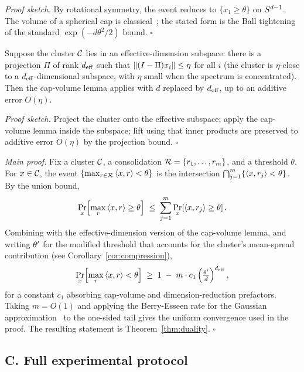 \noindent\emph{Proof sketch.} By rotational symmetry, the event
reduces to $\{x_1 \geq \theta\}$ on $S^{d-1}$. The volume of a
spherical cap is classical~\cite{ball1997elementary,
milman1986asymptotic}; the stated form is the Ball tightening of the
standard $\exp(-d\theta^2/2)$ bound. $\square$

\begin{lemma}
Suppose the cluster $\mathcal{C}$ lies in an effective-dimension
subspace: there is a projection $\Pi$ of rank ${d_{\mathrm{eff}}}$ such that
$\left\lVert(I - \Pi) x_i\right\rVert \leq \eta$ for all $i$ (the cluster is
$\eta$-close to a ${d_{\mathrm{eff}}}$-dimensional subspace, with $\eta$ small
when the spectrum is concentrated). Then the cap-volume lemma
applies with $d$ replaced by ${d_{\mathrm{eff}}}$, up to an additive error
$O(\eta)$.
\end{lemma}

\noindent\emph{Proof sketch.} Project the cluster onto the effective
subspace; apply the cap-volume lemma inside the subspace; lift
using that inner products are preserved to additive error $O(\eta)$
by the projection bound. $\square$

\noindent\emph{Main proof.} Fix a cluster $\mathcal{C}$, a
consolidation $\mathcal{R} = \{r_1, \ldots, r_m\}$, and a threshold
$\theta$. For $x \in \mathcal{C}$, the event
$\{\max_{r \in \mathcal{R}} \left\langle x,r\right\rangle < \theta\}$ is the intersection
$\bigcap_{j=1}^{m} \{\left\langle x,r_j\right\rangle < \theta\}$. By the union bound,
\[
\Pr_{x}\!\left[\max_{r} \left\langle x,r\right\rangle \geq \theta \right] \;\leq\;
\sum_{j=1}^{m} \Pr_{x}\!\left[\left\langle x,r_j\right\rangle \geq \theta\right].
\]
Combining with the effective-dimension version of the cap-volume
lemma, and writing $\theta'$ for the modified threshold that
accounts for the cluster's mean-spread contribution (see
Corollary~\ref{cor:compression}),
\[
\Pr_{x}\!\left[\max_{r} \left\langle x,r\right\rangle < \theta \right] \;\geq\;
1 \;-\; m \cdot c_1 \left(\tfrac{\theta'}{\bar{d}}\right)^{{d_{\mathrm{eff}}}},
\]
for a constant $c_1$ absorbing cap-volume and dimension-reduction
prefactors. Taking $m = O(1)$ and applying the Berry-Esseen rate
for the Gaussian approximation~\cite{esseen1942} to the one-sided
tail gives the uniform convergence used in the proof. The
resulting statement is Theorem~\ref{thm:duality}. $\square$

\subsection*{C. Full experimental protocol}
\label{sec:methods:protocol}

